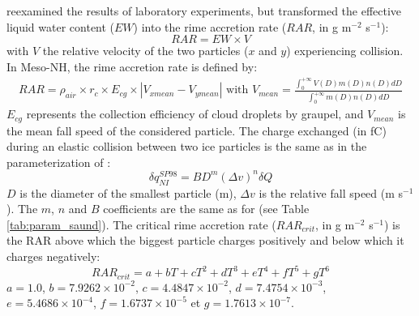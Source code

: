 \citet{Brooks-1997} reexamined the results of \citet{Saunders-1991} laboratory experiments, but transformed the effective liquid water content ($EW$) into the rime accretion rate ($RAR$, in g m$^{-2}$ s$^{-1}$):
$$RAR = EW \times V$$
with $V$ the relative velocity of the two particles ($x$ and $y$) experiencing collision.
In Meso-NH, the rime accretion rate is defined by:
\begin{equation}
  \begin{array}{rl}
    RAR = \rho _{air} \times r_c \times E_{cg} \times |V_{xmean} - V_{ymean}|  \mbox{ with } V_{mean} = \frac{\int _0 ^{+\infty} V(D) m(D) n(D) dD}{\int _0 ^{+\infty} m(D) n(D) dD}
  \end{array}
\end{equation}
$E_{cg}$ represents the collection efficiency of cloud droplets by graupel, and $V_{mean}$ is the mean fall speed of the considered particle.
The charge exchanged (in fC) during an elastic collision between two ice particles is the same as in the parameterization of \citet{Saunders-1991}:
\begin{equation}
  \delta q_{NI} ^{SP98} = B D ^m (\Delta v)^n \delta Q 
\end{equation}
$D$ is the diameter of the smallest particle (m), $\Delta v$ is the relative fall speed (m s$^{-1}$).
The $m$, $n$ and $B$ coefficients are the same as for \citet{Saunders-1991} (see Table \ref{tab:param_saund}).
The critical rime accretion rate ($RAR _{crit}$, in g m$^{-2}$ s$^{-1}$) is the RAR above which the biggest particle charges positively and below which it charges negatively:
\begin{equation}
  RAR_{crit} = a + b T + c T^2 + d T^3 + e T^4 + f T^5 + g T^6
\end{equation}
$a = 1.0$, $b = 7.9262 \times 10^{-2}$, $c = 4.4847 \times 10^{-2}$, $d = 7.4754 \times 10^{-3}$, $e = 5.4686 \times 10^{-4}$, $f = 1.6737 \times 10^{-5}$ et $g = 1.7613 \times 10^{-7}$.

